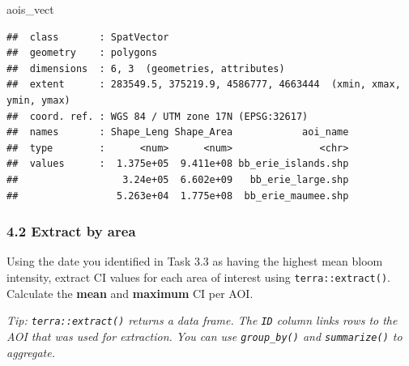 \documentclass[
]{article}
\newenvironment{Shaded}{\begin{snugshade}}{\end{snugshade}}
\newcommand{\AttributeTok}[1]{\textcolor[rgb]{0.13,0.29,0.53}{#1}}
\newcommand{\CommentTok}[1]{\textcolor[rgb]{0.56,0.35,0.01}{\textit{#1}}}
\newcommand{\ConstantTok}[1]{\textcolor[rgb]{0.56,0.35,0.01}{#1}}
\newcommand{\DecValTok}[1]{\textcolor[rgb]{0.00,0.00,0.81}{#1}}
\newcommand{\FunctionTok}[1]{\textcolor[rgb]{0.13,0.29,0.53}{\textbf{#1}}}
\newcommand{\NormalTok}[1]{#1}
\newcommand{\OtherTok}[1]{\textcolor[rgb]{0.56,0.35,0.01}{#1}}
\newcommand{\SpecialCharTok}[1]{\textcolor[rgb]{0.81,0.36,0.00}{\textbf{#1}}}
\begin{document}
\begin{Shaded}
\begin{Highlighting}[]
\NormalTok{aois\_vect}
\end{Highlighting}
\end{Shaded}

\begin{verbatim}
##  class       : SpatVector 
##  geometry    : polygons 
##  dimensions  : 6, 3  (geometries, attributes)
##  extent      : 283549.5, 375219.9, 4586777, 4663444  (xmin, xmax, ymin, ymax)
##  coord. ref. : WGS 84 / UTM zone 17N (EPSG:32617) 
##  names       : Shape_Leng Shape_Area            aoi_name
##  type        :      <num>      <num>               <chr>
##  values      :  1.375e+05  9.411e+08 bb_erie_islands.shp
##                  3.24e+05  6.602e+09   bb_erie_large.shp
##                 5.263e+04  1.775e+08  bb_erie_maumee.shp
\end{verbatim}

\hypertarget{extract-by-area}{%
\subsubsection{4.2 Extract by area}\label{extract-by-area}}

Using the date you identified in Task 3.3 as having the highest mean
bloom intensity, extract CI values for each area of interest using
\texttt{terra::extract()}. Calculate the \textbf{mean} and
\textbf{maximum} CI per AOI.

\emph{Tip: \texttt{terra::extract()} returns a data frame. The
\texttt{ID} column links rows to the AOI that was used for extraction.
You can use \texttt{group\_by()} and \texttt{summarize()} to aggregate.}

\begin{Shaded}
\end{Shaded}
\end{document}
